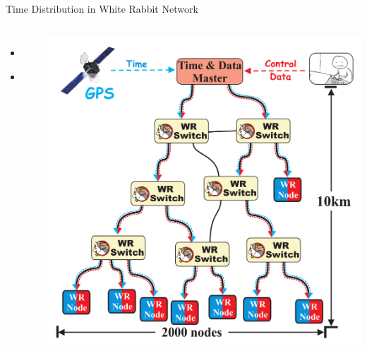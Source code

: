 \documentclass[compress,red]{beamer}
\begin{document}
\subsection{}
\begin{frame}{Time Distribution in White Rabbit Network}


\begin{columns}[c]
 
  \begin{itemize}
    \item \textbf{\color{blue!90}{High accuracy/precision synchronization}}
    \item \color{gray}{Deterministic, reliable and low-latency Control Data delivery}
  \end{itemize}

    \begin{center}
    \includegraphics[height=1.0\textwidth]{network/wr_network-new.pdf}
    \end{center}
\end{columns}

\end{frame}
\end{document}
